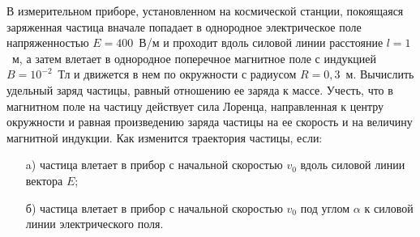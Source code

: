 
В измерительном приборе, установленном на космической станции, покоящаяся заряженная частица вначале 
попадает в однородное электрическое поле напряженностью $E=400$~В/м и проходит вдоль силовой линии 
расстояние $l=1$~м,  а затем влетает в однородное поперечное магнитное поле с индукцией $B=10^{-2}$~Тл и 
движется в нем по окружности с радиусом $R=0,3$~м. Вычислить удельный заряд частицы, равный отношению ее заряда к массе. 
Учесть, что в магнитном поле на частицу действует сила Лоренца, направленная к центру окружности и равная 
произведению заряда частицы на ее скорость и на величину магнитной индукции. Как изменится траектория частицы, если:

\begin{enumerate}
    \item[a)] частица влетает в прибор с начальной скоростью $v_0$ вдоль силовой линии вектора $E$;
    \item[б)] частица влетает в прибор с начальной скоростью $v_0$ под углом $\alpha$ к силовой линии электрического поля.
\end{enumerate}